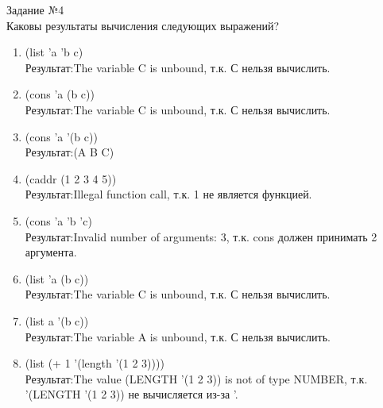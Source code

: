 \begin{figure}[ht!]
\end{figure}

{\LARGE Задание №4}\\
Каковы результаты вычисления следующих выражений?

\begin{enumerate}
\item (list 'a 'b c)\\
Результат:The variable C is unbound, т.к. С нельзя вычислить.
\item (cons 'a (b c))\\
Результат:The variable C is unbound, т.к. С нельзя вычислить.
\item (cons 'a '(b c))\\
Результат:(A B C)
\item (caddr (1 2 3 4 5))\\
Результат:Illegal function call, т.к. 1 не является функцией.
\item (cons 'a 'b 'c)\\
Результат:Invalid number of arguments: 3, т.к. cons должен принимать 2 аргумента.
\item (list 'a (b c))\\
Результат:The variable C is unbound, т.к. С нельзя вычислить.
\item (list a '(b c))\\
Результат:The variable A is unbound, т.к. С нельзя вычислить.
\item (list (+ 1 '(length '(1 2 3))))\\
Результат:The value (LENGTH '(1 2 3)) is not of type NUMBER, т.к. '(LENGTH '(1 2 3)) не вычисляется из-за '.
\end{enumerate}

